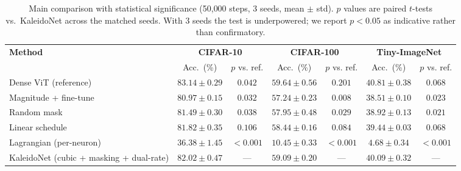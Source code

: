 \begin{table}[t]
\centering
\caption{Main comparison with statistical significance (50{,}000 steps, 3 seeds, mean $\pm$ std). $p$ values are paired $t$-tests vs.\ KaleidoNet across the matched seeds. With 3 seeds the test is underpowered; we report $p<0.05$ as indicative rather than confirmatory.}
\label{tab:main_stats}
\small
\setlength{\tabcolsep}{4pt}
\begin{tabular}{lcccccc}
\toprule
\textbf{Method} & \multicolumn{2}{c}{\textbf{CIFAR-10}} & \multicolumn{2}{c}{\textbf{CIFAR-100}} & \multicolumn{2}{c}{\textbf{Tiny-ImageNet}} \\
\cmidrule(lr){2-3}\cmidrule(lr){4-5}\cmidrule(lr){6-7}
  & Acc.\ (\%) & $p$ vs. ref. & Acc.\ (\%) & $p$ vs. ref. & Acc.\ (\%) & $p$ vs. ref. \\
\midrule
Dense ViT (reference) & $83.14\pm0.29$ & $0.042$ & $59.64\pm0.56$ & $0.201$ & $40.81\pm0.38$ & $0.068$ \\
Magnitude + fine-tune & $80.97\pm0.15$ & $0.032$ & $57.24\pm0.23$ & $0.008$ & $38.51\pm0.10$ & $0.023$ \\
Random mask & $81.49\pm0.30$ & $0.038$ & $57.95\pm0.48$ & $0.029$ & $38.92\pm0.13$ & $0.021$ \\
Linear schedule & $81.82\pm0.35$ & $0.106$ & $58.44\pm0.16$ & $0.084$ & $39.44\pm0.03$ & $0.068$ \\
Lagrangian (per-neuron) & $36.38\pm1.45$ & $<\!0.001$ & $10.45\pm0.33$ & $<\!0.001$ & $4.68\pm0.34$ & $<\!0.001$ \\
KaleidoNet (cubic + masking + dual-rate) & $82.02\pm0.47$ & --- & $59.09\pm0.20$ & --- & $40.09\pm0.32$ & --- \\
\bottomrule
\end{tabular}
\end{table}

